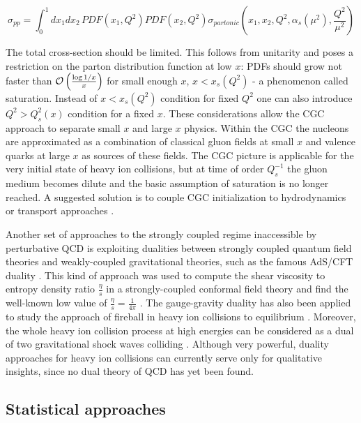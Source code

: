 \begin{equation}
  \sigma_{pp} = \int_0^1 dx_1 dx_2 \, PDF(x_1,Q^2) PDF(x_2,Q^2)
  \sigma_{partonic}\left(x_1,x_2,Q^2,\alpha_s(\mu^2),\frac{Q^2}{\mu^2}\right)
\end{equation}

The total cross-section should be limited. This follows from unitarity
\cite{Froissart:1961ux} and poses a restriction on the parton distribution function at
low $x$: PDFs should grow not faster than $\mathcal{O}\left({\frac{\log 1/x}{x}}\right)$
for small enough $x$, $x < x_s(Q^2)$ - a phenomenon called saturation. Instead of
$x < x_s(Q^2)$ condition for fixed $Q^2$ one can also introduce $Q^2 > Q_s^2(x)$
condition for a fixed $x$. These considerations allow the CGC approach to separate
small $x$ and large $x$ physics. Within the CGC the nucleons are approximated as a combination of
classical gluon fields at small $x$ and valence quarks at large $x$ as sources of
these fields. The CGC picture is applicable for the very initial state of heavy ion collisions,
but at time of order $Q_s^{-1}$ the gluon medium becomes dilute and the 
basic assumption of saturation is no longer reached.  A suggested solution is to couple CGC
initialization to hydrodynamics \cite{Hirano:2005xf} or transport approaches
\cite{Kurkela:2015qoa}.

Another set of approaches to the strongly coupled regime inaccessible by
perturbative QCD is exploiting dualities between strongly coupled quantum
field theories and weakly-coupled gravitational theories, such as the  famous
AdS/CFT duality \cite{Maldacena:1997re}. This kind of approach was used to compute
the shear viscosity to entropy density ratio $\frac{\eta}{s}$ in a strongly-coupled
conformal field theory and find the well-known low value of $\frac{\eta}{s} =
\frac{1}{4\pi}$ \cite{Kovtun:2004de}.  The gauge-gravity duality has also been
applied to study the approach of fireball in heavy ion collisions to equilibrium
\cite{Chesler:2015lsa}.  Moreover, the whole heavy ion collision process at
high energies can be considered as a dual of two gravitational shock waves
colliding \cite{Arefeva:2016lcz}. Although very powerful, duality approaches
for heavy ion collisions can currently serve only for qualitative insights,
since no dual theory of QCD has yet been found.

\subsection{Statistical approaches}

